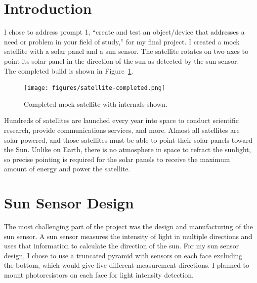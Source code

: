 \FloatBarrier
\section*{Introduction}

I chose to address prompt 1, ``create and test an object/device that addresses a need or problem in your field of study,'' for my final project. I created a mock satellite with a solar panel and a sun sensor. The satellite rotates on two axes to point its solar panel in the direction of the sun as detected by the sun sensor. The completed build is shown in Figure~\ref{fig:satellite-completed}.
\begin{figure}[!ht]
    \centering
    \texttt{[image: figures/satellite-completed.png]}
    \caption{Completed mock satellite with internals shown.}
    \label{fig:satellite-completed}
\end{figure}

Hundreds of satellites are launched every year into space to conduct scientific research, provide communications services, and more. Almost all satellites are solar-powered, and those satellites must be able to point their solar panels toward the Sun. Unlike on Earth, there is no atmosphere in space to refract the sunlight, so precise pointing is required for the solar panels to receive the maximum amount of energy and power the satellite. 



\section*{Sun Sensor Design}

The most challenging part of the project was the design and manufacturing of the sun sensor. A sun sensor measures the intensity of light in multiple directions and uses that information to calculate the direction of the sun. For my sun sensor design, I chose to use a truncated pyramid with sensors on each face excluding the bottom, which would give five different measurement directions. I planned to mount photoresistors on each face for light intensity detection. 

